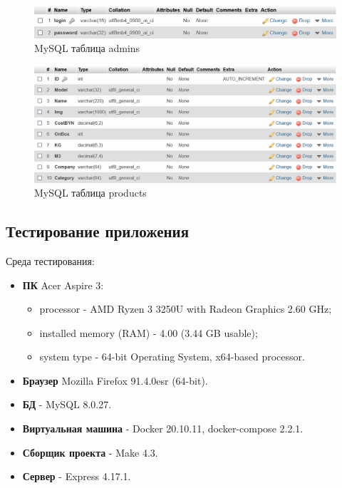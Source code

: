 \begin{figure}[!h]
    \centering
    \includegraphics[width=16cm]
        {_assets/gpi_pz_mysql_admins.png}
    \caption{MySQL таблица admins}
    \label{fig:gpi_pz_mysql_admins}
\end{figure}

\begin{figure}[!h]
    \centering
    \includegraphics[width=16cm]
        {_assets/gpi_pz_mysql_products.png}
    \caption{MySQL таблица products}
    \label{fig:gpi_pz_mysql_products}
\end{figure}

\newpage

\subsection{Тестирование приложения}

Среда тестирования: 

\begin{itemize}
    \item \textbf{ПК} Acer Aspire 3:
    \begin{itemize}
    \item processor - AMD Ryzen 3 3250U with  Radeon Graphics 2.60 GHz;
    \item installed memory (RAM) - 4.00 (3.44 GB usable);
    \item system type - 64-bit Operating System, x64-based processor.
    \end{itemize}
    \item \textbf{Браузер} Mozilla Firefox 91.4.0esr (64-bit).
    \item \textbf{БД} - MySQL 8.0.27.
    \item \textbf{Виртуальная машина} - Docker 20.10.11, docker-compose 2.2.1.
    \item \textbf{Сборщик проекта} - Make 4.3.
    \item \textbf{Сервер} - Express 4.17.1.
\end{itemize}

